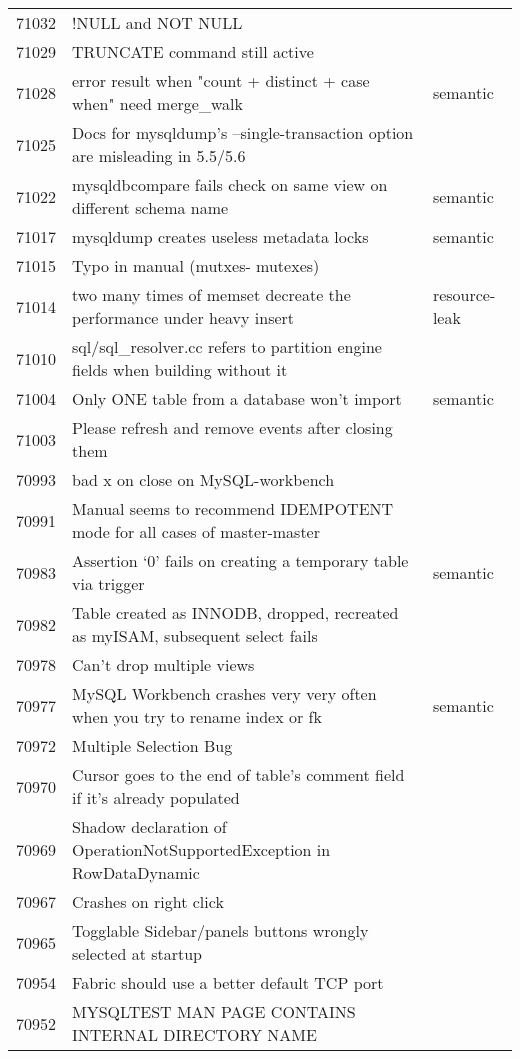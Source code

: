 \begin{longtable}[c]{p{1cm}p{10cm}p{1cm}}
71032 & !NULL and NOT NULL &  \\
71029 & TRUNCATE command still active &  \\
71028 & error result when "count + distinct + case when" need merge\_walk & semantic \\
71025 & Docs for mysqldump's --single-transaction option are misleading in 5.5/5.6 &  \\
71022 & mysqldbcompare fails check on same view on different schema name & semantic \\
71017 & mysqldump creates useless metadata locks & semantic \\
71015 & Typo in manual (mutxes- mutexes) &  \\
71014 & two many times of memset decreate the performance under heavy insert & resource-leak \\
71010 & sql/sql\_resolver.cc refers to partition engine fields when building without it &  \\
71004 & Only ONE table from a database won't import & semantic \\
71003 & Please refresh and remove events after closing them &  \\
70993 & bad x on close on MySQL-workbench &  \\
70991 & Manual seems to recommend IDEMPOTENT mode for all cases of master-master &  \\
70983 & Assertion `0' fails on creating a temporary table via trigger & semantic \\
70982 & Table created as INNODB, dropped, recreated as myISAM, subsequent select fails &  \\
70978 & Can't drop multiple views &  \\
70977 & MySQL Workbench crashes very very often when you try to rename index or fk & semantic \\
70972 & Multiple Selection Bug &  \\
70970 & Cursor goes to the end of table's comment field if it's already populated &  \\
70969 & Shadow declaration of OperationNotSupportedException in RowDataDynamic &  \\
70967 & Crashes on right click &  \\
70965 & Togglable Sidebar/panels buttons wrongly selected at startup &  \\
70954 & Fabric should use a better default TCP port &  \\
70952 & MYSQLTEST MAN PAGE CONTAINS INTERNAL DIRECTORY NAME &  \\

\end{longtable}
